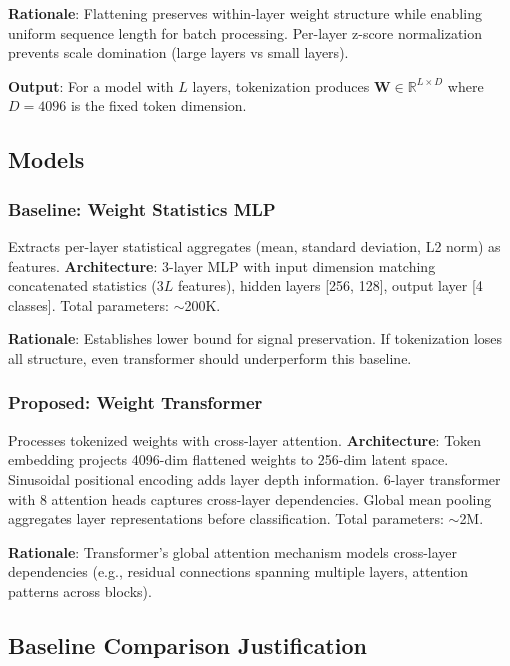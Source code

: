 \textbf{Rationale}: Flattening preserves within-layer weight structure while enabling uniform sequence length for batch processing. Per-layer z-score normalization prevents scale domination (large layers vs small layers).

\textbf{Output}: For a model with $L$ layers, tokenization produces $\mathbf{W} \in \mathbb{R}^{L \times D}$ where $D=4096$ is the fixed token dimension.

\subsection{Models}

\subsubsection{Baseline: Weight Statistics MLP}

Extracts per-layer statistical aggregates (mean, standard deviation, L2 norm) as features. \textbf{Architecture}: 3-layer MLP with input dimension matching concatenated statistics ($3L$ features), hidden layers [256, 128], output layer [4 classes]. Total parameters: $\sim$200K.

\textbf{Rationale}: Establishes lower bound for signal preservation. If tokenization loses all structure, even transformer should underperform this baseline.

\subsubsection{Proposed: Weight Transformer}

Processes tokenized weights with cross-layer attention. \textbf{Architecture}: Token embedding projects 4096-dim flattened weights to 256-dim latent space. Sinusoidal positional encoding adds layer depth information. 6-layer transformer with 8 attention heads captures cross-layer dependencies. Global mean pooling aggregates layer representations before classification. Total parameters: $\sim$2M.

\textbf{Rationale}: Transformer's global attention mechanism models cross-layer dependencies (e.g., residual connections spanning multiple layers, attention patterns across blocks).

\subsection{Baseline Comparison Justification}

